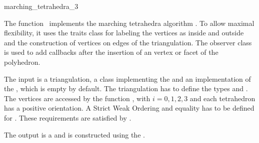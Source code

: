 

\begin{ccRefFunction}{marching_tetrahedra_3}

\ccDefinition

The function \ccRefName\ implements the marching tetrahedra algorithm
\cite{cgal:tpg-rmtiise-99}. To allow maximal flexibility, it uses the
traits class  for labeling the
vertices as inside and outside and the construction of vertices on
edges of the triangulation. The observer class
 is used to add callbacks after the
insertion of an vertex or facet of the polyhedron.

The input is a triangulation, a class implementing the
 and an implementation of the
, which is empty by default. The
triangulation has to define the types  and
. The vertices are accessed by the function
, with $i=0,1,2,3$ and each tetrahedron has a positive
orientation. A Strict Weak Ordering and equality has to be defined for
. These requirements are satisfied by
.

The output is a  and is constructed using the
.



\ccSeeAlso
{}\\
\\
\\

\end{ccRefFunction}


